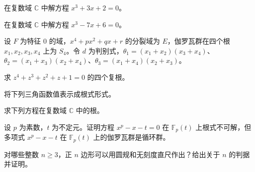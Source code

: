 \noindent\begin{minipage}{\textwidth}
在复数域 $\mathbb C$ 中解方程 $x^3+3x+2=0$。
\end{minipage}\par\vfill
\noindent\begin{minipage}{\textwidth}
在复数域 $\mathbb C$ 中解方程 $x^3-7x+6=0$。
\end{minipage}\par\vfill
\newpage
\noindent\begin{minipage}{\textwidth}
设 $F$ 为特征 $0$ 的域，$x^4+px^2+qx+r$ 的分裂域为 $E$，伽罗瓦群在四个根 $x_1,x_2,x_3,x_4$ 上为 $S_4$。令 $d$ 为判别式，$\theta_1=(x_1+x_2)(x_3+x_4)$、$\theta_2=(x_1+x_3)(x_2+x_4)$、$\theta_3=(x_1+x_4)(x_2+x_3)$。
\end{minipage}\par\vfill
\noindent\begin{minipage}{\textwidth}
求 $z^4+z^3+z^2+z+1=0$ 的四个复根。
\end{minipage}\par\vfill
\noindent\begin{minipage}{\textwidth}
将下列三角函数值表示成根式形式。
\end{minipage}\par\vfill
\newpage
\noindent\begin{minipage}{\textwidth}
求下列方程在复数域 $\mathbb C$ 中的根。
\end{minipage}\par\vfill
\noindent\begin{minipage}{\textwidth}
设 $p$ 为素数，$t$ 为不定元。证明方程 $x^p-x-t=0$ 在 $\mathbb F_p(t)$ 上根式不可解，但多项式 $x^p-x-t$ 在 $\mathbb F_p(t)$ 上的伽罗瓦群是循环群。
\end{minipage}\par\vfill
\noindent\begin{minipage}{\textwidth}
对哪些整数 $n\ge 3$，正 $n$ 边形可以用圆规和无刻度直尺作出？给出关于 $n$ 的判据并证明。
\end{minipage}\par\vfill
